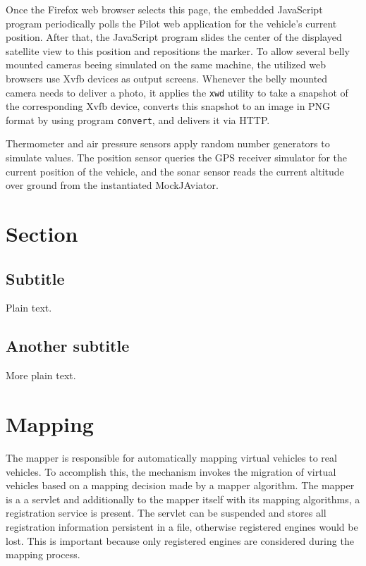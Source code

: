 Once the Firefox web browser selects this page, the embedded JavaScript program periodically polls the Pilot web
application for the vehicle's current position. After that, the JavaScript program slides the center of the
displayed satellite view to this position and repositions the marker.
To allow several belly mounted cameras beeing simulated on the same machine, the utilized web browsers use \ac{Xvfb}
devices as output screens.
%
Whenever the belly mounted camera needs to deliver a photo, it applies the \texttt{xwd} utility to take a snapshot
of the corresponding \ac{Xvfb} device, converts this snapshot to an image in PNG format by using program
\texttt{convert}, and delivers it via \ac{HTTP}.

Thermometer and air pressure sensors apply random number generators to simulate values.
The position sensor queries the GPS receiver simulator for the current position of the vehicle, and the sonar
sensor reads the current altitude over ground from the instantiated MockJAviator.


\section{Section}

\subsection{Subtitle}

Plain text.

\subsection{Another subtitle}

More plain text.


\section{Mapping}
The mapper is responsible for automatically mapping virtual vehicles to real vehicles. To accomplish this, the mechanism invokes 
the migration of virtual vehicles based on a mapping decision made by a mapper algorithm. The mapper is a a servlet and additionally 
to the mapper itself with its mapping algorithms, a registration service is present. The servlet can be suspended and stores all
registration information persistent in a file, otherwise registered engines would be lost. This is important because only registered 
engines are considered during the mapping process.

